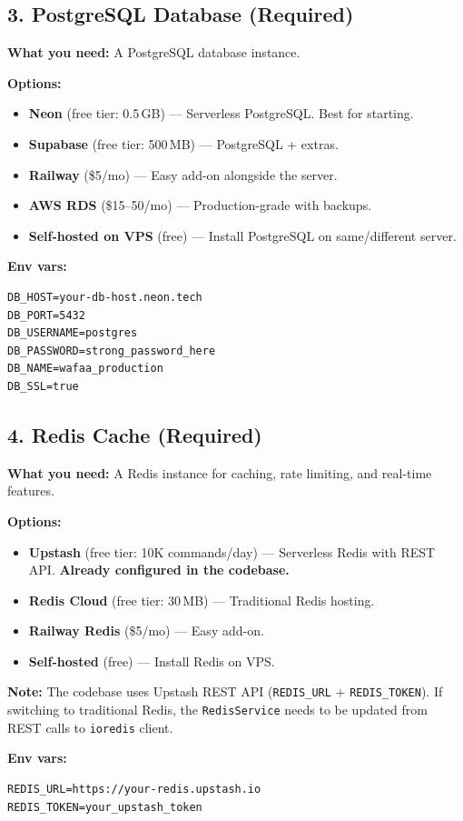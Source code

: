 \documentclass[a4paper,11pt]{article}
\begin{document}
\subsection{3. PostgreSQL Database (Required)}

\begin{clientbox}
\textbf{What you need:} A PostgreSQL database instance.

\textbf{Options:}
\begin{itemize}[leftmargin=1.5em]
    \item \textbf{Neon} (free tier: 0.5\,GB) --- Serverless PostgreSQL. Best for starting.
    \item \textbf{Supabase} (free tier: 500\,MB) --- PostgreSQL + extras.
    \item \textbf{Railway} (\$5/mo) --- Easy add-on alongside the server.
    \item \textbf{AWS RDS} (\$15--50/mo) --- Production-grade with backups.
    \item \textbf{Self-hosted on VPS} (free) --- Install PostgreSQL on same/different server.
\end{itemize}

\textbf{Env vars:}
\begin{lstlisting}
DB_HOST=your-db-host.neon.tech
DB_PORT=5432
DB_USERNAME=postgres
DB_PASSWORD=strong_password_here
DB_NAME=wafaa_production
DB_SSL=true
\end{lstlisting}
\end{clientbox}

\subsection{4. Redis Cache (Required)}

\begin{clientbox}
\textbf{What you need:} A Redis instance for caching, rate limiting, and real-time features.

\textbf{Options:}
\begin{itemize}[leftmargin=1.5em]
    \item \textbf{Upstash} (free tier: 10K commands/day) --- Serverless Redis with REST API. \textbf{Already configured in the codebase.}
    \item \textbf{Redis Cloud} (free tier: 30\,MB) --- Traditional Redis hosting.
    \item \textbf{Railway Redis} (\$5/mo) --- Easy add-on.
    \item \textbf{Self-hosted} (free) --- Install Redis on VPS.
\end{itemize}

\textbf{Note:} The codebase uses Upstash REST API (\texttt{REDIS\_URL} + \texttt{REDIS\_TOKEN}). If switching to traditional Redis, the \texttt{RedisService} needs to be updated from REST calls to \texttt{ioredis} client.

\textbf{Env vars:}
\begin{lstlisting}
REDIS_URL=https://your-redis.upstash.io
REDIS_TOKEN=your_upstash_token
\end{lstlisting}
\end{clientbox}
\end{document}
